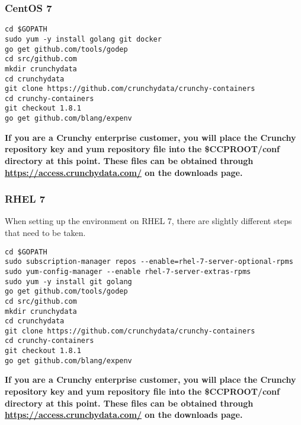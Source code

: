 \documentclass[letterpaper,12pt]{article}
\begin{document}
\subsubsection{CentOS 7}\label{/_project_setup/_project_directory_structure/_centos_7}
\vspace{.75em}
\begin{lstlisting}
cd $GOPATH
sudo yum -y install golang git docker
go get github.com/tools/godep
cd src/github.com
mkdir crunchydata
cd crunchydata
git clone https://github.com/crunchydata/crunchy-containers
cd crunchy-containers
git checkout 1.8.1
go get github.com/blang/expenv
\end{lstlisting}

\textbf{If you are a Crunchy enterprise customer, you will place the Crunchy repository key and yum repository file into the \$CCPROOT/conf directory at this point. These files can be obtained through \href{https://access.crunchydata.com/}{https://access.crunchydata.com/} on the downloads page.}

\subsubsection{RHEL 7}\label{/_project_setup/_project_directory_structure/_rhel_7}

When setting up the environment on RHEL 7, there are slightly different steps that need to be taken.
\vspace{.75em}
\begin{lstlisting}
cd $GOPATH
sudo subscription-manager repos --enable=rhel-7-server-optional-rpms
sudo yum-config-manager --enable rhel-7-server-extras-rpms
sudo yum -y install git golang
go get github.com/tools/godep
cd src/github.com
mkdir crunchydata
cd crunchydata
git clone https://github.com/crunchydata/crunchy-containers
cd crunchy-containers
git checkout 1.8.1
go get github.com/blang/expenv
\end{lstlisting}

\textbf{If you are a Crunchy enterprise customer, you will place the Crunchy repository key and yum repository file into the \$CCPROOT/conf directory at this point. These files can be obtained through \href{https://access.crunchydata.com/}{https://access.crunchydata.com/} on the downloads page.}
\end{document}
